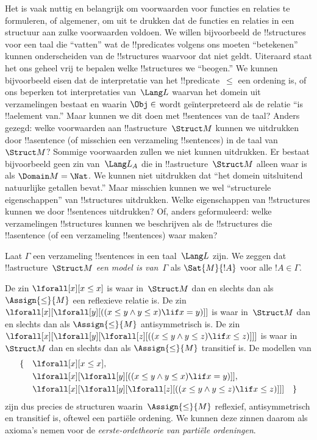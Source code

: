 \documentclass[openany]{memoir}
\begin{document}
\begin{explain}
Het is vaak nuttig en belangrijk om voorwaarden voor functies en
relaties te formuleren, of algemener, om uit te drukken dat de functies
en relaties in een structuur aan zulke voorwaarden voldoen. We willen
bijvoorbeeld de !!{structure}s voor een taal die ``vatten'' wat de
!!{predicate}s volgens ons moeten ``betekenen'' kunnen onderscheiden
van de !!{structure}s waarvoor dat niet geldt. Uiteraard staat het ons
geheel vrij te bepalen welke !!{structure}s we ``beogen.'' We kunnen
bijvoorbeeld eisen dat de interpretatie van het !!{predicate}~$\le$
een ordening is, of ons beperken tot interpretaties van~$\Lang L$
waarvan het domein uit verzamelingen bestaat en waarin $\Obj \in$ wordt
geïnterpreteerd als de relatie ``is !!a{element} van.'' Maar kunnen we
dit doen met !!{sentence}s van de taal? Anders gezegd: welke
voorwaarden aan !!a{structure}~$\Struct M$ kunnen we uitdrukken door
!!a{sentence} (of misschien een verzameling !!{sentence}s) in de taal
van~$\Struct M$? Sommige voorwaarden zullen we niet kunnen uitdrukken.
Er bestaat bijvoorbeeld geen zin van~$\Lang L_A$ die in
!!a{structure}~$\Struct M$ alleen waar is als $\Domain M = \Nat$. We
kunnen niet uitdrukken dat ``het domein uitsluitend natuurlijke
getallen bevat.'' Maar misschien kunnen we wel ``structurele
eigenschappen'' van !!{structure}s uitdrukken. Welke eigenschappen van
!!{structure}s kunnen we door !!{sentence}s uitdrukken? Of, anders
geformuleerd: welke verzamelingen !!{structure}s kunnen we beschrijven
als de !!{structure}s die !!a{sentence} (of een verzameling
!!{sentence}s) waar maken?
\end{explain}

\begin{defn}
Laat $\Gamma$ een verzameling !!{sentence}s in een taal~$\Lang L$ zijn.
We zeggen dat !!a{structure}~$\Struct M$ \emph{een model is van}~$\Gamma$
als $\Sat{M}{!A}$ voor alle $!A \in \Gamma$.
\end{defn}

\begin{ex}
De zin $\lforall[x][x \le x]$ is waar in~$\Struct M$ dan en slechts
dan als $\Assign{\le}{M}$ een reflexieve relatie is. De zin
$\lforall[x][\lforall[y][((x \le y \land y \le x) \lif x = y)]]$ is
waar in~$\Struct M$ dan en slechts dan als $\Assign{\le}{M}$
antisymmetrisch is. De zin
$\lforall[x][\lforall[y][\lforall[z][((x \le y \land y \le z)
      \lif x \le z)]]]$ is waar in~$\Struct M$ dan en slechts dan als
$\Assign{\le}{M}$ transitief is. De modellen van
\begin{align*}
\{\quad &\lforall[x][x \le x], \\
   & \lforall[x][\lforall[y][((x \le y \land y \le
    x) \lif x = y)]], \\
   &\lforall[x][\lforall[y][\lforall[z][((x \le y
      \land y \le z) \lif x \le z)]]] \quad \}
\end{align*}
zijn dus precies de structuren waarin~$\Assign{\le}{M}$ reflexief,
antisymmetrisch en transitief is, oftewel een partiële ordening. We
kunnen deze zinnen daarom als axioma's nemen voor de
\emph{eerste-ordetheorie van partiële ordeningen}.
\end{ex}
\endgroup
\end{document}
